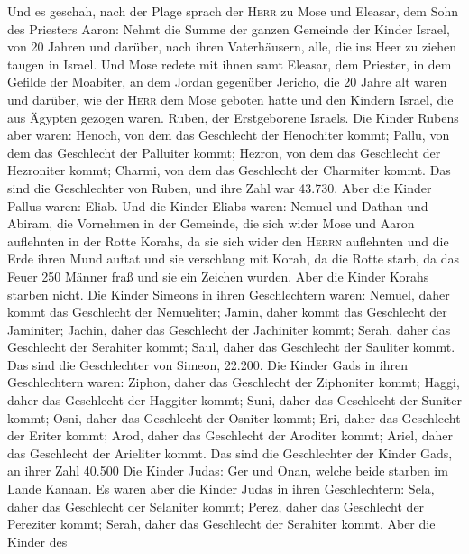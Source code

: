  Und es geschah, nach der Plage sprach der \textsc{Herr}
zu Mose und Eleasar, dem Sohn des Priesters Aaron:  Nehmt
die Summe der ganzen Gemeinde der Kinder Israel, von 20 Jahren und
darüber, nach ihren Vaterhäusern, alle, die ins Heer zu ziehen taugen in
Israel.  Und Mose redete mit ihnen samt Eleasar, dem
Priester, in dem Gefilde der Moabiter, an dem Jordan gegenüber Jericho,
 die 20 Jahre alt waren und darüber, wie der \textsc{Herr}
dem Mose geboten hatte und den Kindern Israel, die aus Ägypten gezogen
waren.  Ruben, der Erstgeborene Israels. Die Kinder Rubens
aber waren: Henoch, von dem das Geschlecht der Henochiter kommt; Pallu,
von dem das Geschlecht der Palluiter kommt;  Hezron, von
dem das Geschlecht der Hezroniter kommt; Charmi, von dem das Geschlecht
der Charmiter kommt.  Das sind die Geschlechter von Ruben,
und ihre Zahl war 43.730.  Aber die Kinder Pallus waren:
Eliab.  Und die Kinder Eliabs waren: Nemuel und Dathan und
Abiram, die Vornehmen in der Gemeinde, die sich wider Mose und Aaron
auflehnten in der Rotte Korahs, da sie sich wider den \textsc{Herrn}
auflehnten  und die Erde ihren Mund auftat und sie
verschlang mit Korah, da die Rotte starb, da das Feuer 250 Männer fraß
und sie ein Zeichen wurden.  Aber die Kinder Korahs
starben nicht.  Die Kinder Simeons in ihren Geschlechtern
waren: Nemuel, daher kommt das Geschlecht der Nemueliter; Jamin, daher
kommt das Geschlecht der Jaminiter; Jachin, daher das Geschlecht der
Jachiniter kommt;  Serah, daher das Geschlecht der
Serahiter kommt; Saul, daher das Geschlecht der Sauliter kommt.
 Das sind die Geschlechter von Simeon, 22.200.
 Die Kinder Gads in ihren Geschlechtern waren: Ziphon,
daher das Geschlecht der Ziphoniter kommt; Haggi, daher das Geschlecht
der Haggiter kommt; Suni, daher das Geschlecht der Suniter kommt;
 Osni, daher das Geschlecht der Osniter kommt; Eri, daher
das Geschlecht der Eriter kommt;  Arod, daher das
Geschlecht der Aroditer kommt; Ariel, daher das Geschlecht der Arieliter
kommt.  Das sind die Geschlechter der Kinder Gads, an
ihrer Zahl 40.500  Die Kinder Judas: Ger und Onan, welche
beide starben im Lande Kanaan.  Es waren aber die Kinder
Judas in ihren Geschlechtern: Sela, daher das Geschlecht der Selaniter
kommt; Perez, daher das Geschlecht der Pereziter kommt; Serah, daher das
Geschlecht der Serahiter kommt.  Aber die Kinder des
